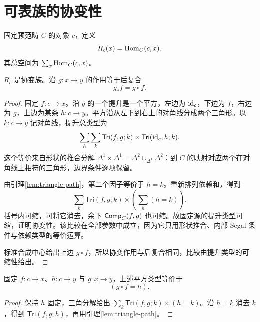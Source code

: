 \section{可表族的协变性}
\begin{definition}[协变可表族]
固定预范畴 $C$ 的对象 $c$，定义
\[
R_c(x)=\operatorname{Hom}_C(c,x).
\]
其总空间为 $\sum_x\operatorname{Hom}_C(c,x)$。
\end{definition}
\begin{theorem}[可表族协变]\label{thm:representable-covariant}
$R_c$ 是协变族。沿 $g:x\to y$ 的作用等于后复合
\[
g_*f=g\circ f.
\]
\end{theorem}
\begin{proof}
固定 $f:c\to x$。沿 $g$ 的一个提升是一个平方，左边为 $\operatorname{id}_c$，下边为 $f$，右边为 $g$，上边为某条 $h:c\to y$。平方沿从左下到右上的对角线分成两个三角形。以 $k:c\to y$ 记对角线，提升总类型为
\[
\sum_h\sum_k
\mathsf{Tri}(f,g;k)\times
\mathsf{Tri}(\operatorname{id}_c,h;k).
\]
这个等价来自形状的推合分解
$\Delta^1\times\Delta^1=\Delta^2\cup_{\Delta^1}\Delta^2$：到 $C$ 的映射对应两个在对角线上相符的三角形，边界条件逐项保留。

由引理\ref{lem:triangle-path}，第二个因子等价于 $h=k$。重新排列依赖和，得到
\[
\sum_k\mathsf{Tri}(f,g;k)\times
\left(\sum_h(h=k)\right).
\]
括号内可缩，可将它消去，余下 $\mathsf{Comp}_C(f,g)$ 也可缩。故固定源的提升类型可缩，证明协变性。该比较在全部参数中成立，因为它只用形状推合、内部 Segal 条件与依赖类型的等价运算。

标准合成中心给出上边 $g\circ f$，所以协变作用与后复合相同，比较由提升类型的可缩性给出。
\end{proof}
\begin{proposition}[固定终点的平方公式]\label{prop:coslice-square}
固定 $f:c\to x$、$h:c\to y$ 与 $g:x\to y$，上述平方类型等价于
\[
(g\circ f=h).
\]
\end{proposition}
\begin{proof}
保持 $h$ 固定，三角分解给出
$\sum_k\mathsf{Tri}(f,g;k)\times(h=k)$。沿 $h=k$ 消去 $k$，得到 $\mathsf{Tri}(f,g;h)$，再用引理\ref{lem:triangle-path}。
\end{proof}
